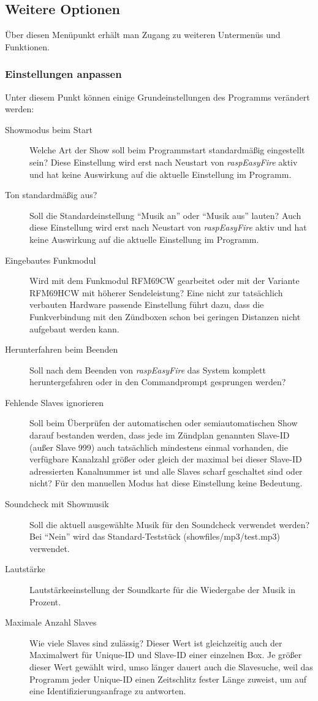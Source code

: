 \documentclass[paper=a4, parskip, numbers=noenddot, toc=listof, headsepline]{scrbook}
\newcommand{\REF}{\emph{raspEasyFire}}
\begin{document}
			\subsection{Weitere Optionen}
				Über diesen Menüpunkt erhält man Zugang zu weiteren Untermenüs und Funktionen.
				
				\subsubsection{Einstellungen anpassen}
					Unter diesem Punkt können einige Grundeinstellungen des Programms verändert werden:
					\begin{description}
						\item [Showmodus beim Start]
						      Welche Art der Show soll beim Programmstart standardmäßig eingestellt sein? Diese Einstellung wird erst nach Neustart von {\REF} aktiv und hat keine Auswirkung auf die aktuelle Einstellung im Programm.
						\item [Ton standardmäßig aus?]
						      Soll die Standardeinstellung \enquote{Musik an} oder \enquote{Musik aus} lauten? Auch diese Einstellung wird erst nach Neustart von {\REF} aktiv und hat keine Auswirkung auf die aktuelle Einstellung im Programm.
						\item [Eingebautes Funkmodul]
							  Wird mit dem Funkmodul RFM69CW gearbeitet oder mit der Variante RFM69HCW mit höherer Sendeleistung? Eine nicht zur tatsächlich verbauten Hardware passende Einstellung führt dazu, dass die Funkverbindung mit den Zündboxen schon bei geringen Distanzen nicht aufgebaut werden kann.
						\item [Herunterfahren beim Beenden]
						      Soll nach dem Beenden von {\REF} das System komplett heruntergefahren oder in den Commandprompt gesprungen werden?
						\item [Fehlende Slaves ignorieren]
						      Soll beim Überprüfen der automatischen oder semiautomatischen Show darauf bestanden werden, dass jede im Zündplan genannten Slave-ID (außer Slave 999) auch tatsächlich mindestens einmal vorhanden, die verfügbare Kanalzahl größer oder gleich der maximal bei dieser Slave-ID adressierten Kanalnummer ist und alle Slaves scharf geschaltet sind oder nicht? Für den manuellen Modus hat diese Einstellung keine Bedeutung.
						\item [Soundcheck mit Showmusik]
							  Soll die aktuell ausgewählte Musik für den Soundcheck verwendet werden? Bei \enquote{Nein} wird das Standard-Teststück (showfiles/mp3/test.mp3) verwendet.
						\item [Lautstärke]
						      Lautstärkeeinstellung der Soundkarte für die Wiedergabe der Musik in Prozent.
						\item [Maximale Anzahl Slaves]
						      Wie viele Slaves sind zulässig? Dieser Wert ist gleichzeitig auch der Maximalwert für Unique-ID und Slave-ID einer einzelnen Box. Je größer dieser Wert gewählt wird, umso länger dauert auch die Slavesuche, weil das Programm jeder Unique-ID einen Zeitschlitz fester Länge zuweist, um auf eine Identifizierungsanfrage zu antworten.
					\end{description}
\end{document}

